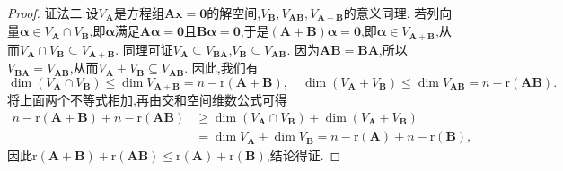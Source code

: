 \documentclass[../../main.tex]{subfiles}%
\begin{document}
\begin{proof}
{\color{blue}证法二:}设\(V_{\boldsymbol{A}}\)是方程组\(\boldsymbol{A}\boldsymbol{x}=\boldsymbol{0}\)的解空间,\(V_{\boldsymbol{B}},V_{\boldsymbol{A}\boldsymbol{B}},V_{\boldsymbol{A}+\boldsymbol{B}}\)的意义同理. 若列向量\(\boldsymbol{\alpha}\in V_{\boldsymbol{A}}\cap V_{\boldsymbol{B}}\),即\(\boldsymbol{\alpha}\)满足\(\boldsymbol{A}\boldsymbol{\alpha}=\boldsymbol{0}\)且\(\boldsymbol{B}\boldsymbol{\alpha}=\boldsymbol{0}\),于是\((\boldsymbol{A}+\boldsymbol{B})\boldsymbol{\alpha}=\boldsymbol{0}\),即\(\boldsymbol{\alpha}\in V_{\boldsymbol{A}+\boldsymbol{B}}\),从而\(V_{\boldsymbol{A}}\cap V_{\boldsymbol{B}}\subseteq V_{\boldsymbol{A}+\boldsymbol{B}}\). 同理可证\(V_{\boldsymbol{A}}\subseteq V_{\boldsymbol{B}\boldsymbol{A}}\),\(V_{\boldsymbol{B}}\subseteq V_{\boldsymbol{A}\boldsymbol{B}}\). 因为\(\boldsymbol{A}\boldsymbol{B}=\boldsymbol{B}\boldsymbol{A}\),所以\(V_{\boldsymbol{B}\boldsymbol{A}} = V_{\boldsymbol{A}\boldsymbol{B}}\),从而\(V_{\boldsymbol{A}}+V_{\boldsymbol{B}}\subseteq V_{\boldsymbol{A}\boldsymbol{B}}\). 因此,我们有
\[
\dim(V_{\boldsymbol{A}}\cap V_{\boldsymbol{B}})\leqslant \dim V_{\boldsymbol{A}+\boldsymbol{B}}=n - \mathrm{r}(\boldsymbol{A}+\boldsymbol{B}),\quad\dim(V_{\boldsymbol{A}}+V_{\boldsymbol{B}})\leqslant \dim V_{\boldsymbol{A}\boldsymbol{B}}=n - \mathrm{r}(\boldsymbol{A}\boldsymbol{B}).
\]
将上面两个不等式相加,再由交和空间维数公式可得
\begin{align*}
n - \mathrm{r}(\boldsymbol{A}+\boldsymbol{B})+n - \mathrm{r}(\boldsymbol{A}\boldsymbol{B})&\geqslant \dim(V_{\boldsymbol{A}}\cap V_{\boldsymbol{B}})+\dim(V_{\boldsymbol{A}}+V_{\boldsymbol{B}})\\
&=\dim V_{\boldsymbol{A}}+\dim V_{\boldsymbol{B}}=n - \mathrm{r}(\boldsymbol{A})+n - \mathrm{r}(\boldsymbol{B}),
\end{align*}
因此\(\mathrm{r}(\boldsymbol{A}+\boldsymbol{B})+\mathrm{r}(\boldsymbol{A}\boldsymbol{B})\leqslant \mathrm{r}(\boldsymbol{A})+\mathrm{r}(\boldsymbol{B})\),结论得证.


\end{proof}
\end{document}
